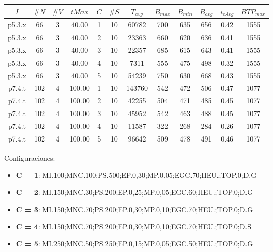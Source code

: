 \begin{center}
\begin{tabular}{ |c|c|c|c|c|c|c|c|c|c|c|c| } 
 \hline
$I$ & $\#N$ & $\#V$ & $tMax$ & $C$ & $\#S$ & $T_{avg}$ & $B_{max}$ & $B_{min}$ & $B_{avg}$ & $i_{eAvg}$ & $BTP_{max}$ \\
\hline
p5.3.x & 66 & 3 & 40.00 & 1 & 10 & 60782 & 700 & 635 & 656 & 0.42 & 1555  \\
p5.3.x & 66 & 3 & 40.00 & 2 & 10 & 23363 & 660 & 620 & 636 & 0.41 & 1555  \\
p5.3.x & 66 & 3 & 40.00 & 3 & 10 & 22357 & 685 & 615 & 643 & 0.41 & 1555  \\
p5.3.x & 66 & 3 & 40.00 & 4 & 10 & 7311 & 555 & 475 & 498 & 0.32 & 1555  \\
p5.3.x & 66 & 3 & 40.00 & 5 & 10 & 54239 & 750 & 630 & 668 & 0.43 & 1555  \\
p7.4.t & 102 & 4 & 100.00 & 1 & 10 & 143760 & 542 & 472 & 506 & 0.47 & 1077  \\
p7.4.t & 102 & 4 & 100.00 & 2 & 10 & 42255 & 504 & 471 & 485 & 0.45 & 1077  \\
p7.4.t & 102 & 4 & 100.00 & 3 & 10 & 45952 & 542 & 463 & 488 & 0.45 & 1077  \\
p7.4.t & 102 & 4 & 100.00 & 4 & 10 & 11587 & 322 & 268 & 284 & 0.26 & 1077  \\
p7.4.t & 102 & 4 & 100.00 & 5 & 10 & 96642 & 509 & 478 & 491 & 0.46 & 1077  \\
\hline
\end{tabular}
\end{center}

\bigskip

Configuraciones: 
\begin{itemize}
  \item \textbf{C = 1}: MI.100;MNC.100;PS.500;EP.0,30;MP.0,05;EGC.70;HEU.;TOP.0;D.G
  \item \textbf{C = 2}: MI.150;MNC.30;PS.200;EP.0,25;MP.0,05;EGC.60;HEU.;TOP.0;D.G 
  \item \textbf{C = 3}: MI.150;MNC.70;PS.200;EP.0,30;MP.0,10;EGC.70;HEU.;TOP.0;D.G
  \item \textbf{C = 4}: MI.150;MNC.70;PS.200;EP.0,30;MP.0,10;EGC.70;HEU.;TOP.0;D.S
  \item \textbf{C = 5}: MI.250;MNC.50;PS.250;EP.0,15;MP.0,05;EGC.50;HEU.;TOP.0;D.G 
\end{itemize}

\bigskip


